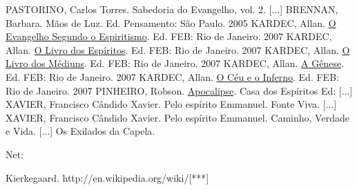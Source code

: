 \documentclass[12pt,a4paper]{article}
\begin{document}
	\begin{thebibliography}{15}

		 PASTORINO, Carlos Torres. Sabedoria do Evangelho, vol. 2. [...]
		 BRENNAN, Barbara. M\~aos de Luz. Ed. Pensamento: S\~ao Paulo. 2005
		 KARDEC, Allan. \href{https://github.com/boralaemcasa/propagation/tree/master/webs%20dot%20com/citacoes/Allan Kardec - O Evangelho Segundo o Espiritismo.pdf}{O Evangelho Segundo o Espiritismo}. Ed. FEB: Rio de Janeiro. 2007
		 KARDEC, Allan. \href{https://github.com/boralaemcasa/propagation/tree/master/webs%20dot%20com/citacoes/Allan Kardec - O Livro dos Espiritos.pdf}{O Livro dos Esp\'iritos}. Ed. FEB: Rio de Janeiro. 2007
		 KARDEC, Allan. \href{https://github.com/boralaemcasa/propagation/tree/master/webs%20dot%20com/citacoes/Allan Kardec - O Livro dos Mediuns.pdf}{O Livro dos M\'ediuns}. Ed. FEB: Rio de Janeiro. 2007
		 KARDEC, Allan. \href{https://github.com/boralaemcasa/propagation/tree/master/webs%20dot%20com/citacoes/Allan Kardec - A Genese.pdf}{A G\^enese}. Ed. FEB: Rio de Janeiro. 2007
		 KARDEC, Allan. \href{https://github.com/boralaemcasa/propagation/tree/master/webs%20dot%20com/citacoes/Allan Kardec - O Ceu e o Inferno.pdf}{O C\'eu e o Inferno}. Ed. FEB: Rio de Janeiro. 2007
		 PINHEIRO, Robson. \href{https://github.com/boralaemcasa/propagation/tree/master/webs%20dot%20com/citacoes/Robson Pinheiro - Apocalipse.pdf}{Apocalipse}. Casa dos Esp\'iritos Ed: [...]
		 XAVIER, Francisco C\^andido Xavier. Pelo esp\'irito Emmanuel. Fonte Viva. [...]
		 XAVIER, Francisco C\^andido Xavier. Pelo esp\'irito Emmanuel. Caminho, Verdade e Vida. [...]
		 Os Exilados da Capela.

		\begin{flushright}
		\end{flushright}

		Net:

		 Kierkegaard. http://en.wikipedia.org/wiki/[***]


\end{thebibliography}
\end{document}
